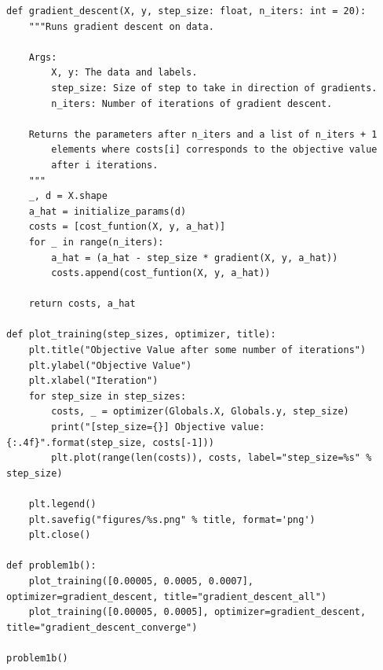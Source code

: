 \documentclass[12pt]{article}
\begin{document}
\begin{enumerate}[label=(\alph*)]
\begin{verbatim}
def gradient_descent(X, y, step_size: float, n_iters: int = 20):
    """Runs gradient descent on data.
    
    Args:
        X, y: The data and labels.
        step_size: Size of step to take in direction of gradients.
        n_iters: Number of iterations of gradient descent.
        
    Returns the parameters after n_iters and a list of n_iters + 1
        elements where costs[i] corresponds to the objective value
        after i iterations.
    """
    _, d = X.shape
    a_hat = initialize_params(d)
    costs = [cost_funtion(X, y, a_hat)]
    for _ in range(n_iters):
        a_hat = (a_hat - step_size * gradient(X, y, a_hat))
        costs.append(cost_funtion(X, y, a_hat))
        
    return costs, a_hat

def plot_training(step_sizes, optimizer, title):
    plt.title("Objective Value after some number of iterations")
    plt.ylabel("Objective Value")
    plt.xlabel("Iteration")
    for step_size in step_sizes:
        costs, _ = optimizer(Globals.X, Globals.y, step_size)
        print("[step_size={}] Objective value: {:.4f}".format(step_size, costs[-1]))
        plt.plot(range(len(costs)), costs, label="step_size=%s" % step_size)

    plt.legend()
    plt.savefig("figures/%s.png" % title, format='png')
    plt.close()

def problem1b():
    plot_training([0.00005, 0.0005, 0.0007], optimizer=gradient_descent, title="gradient_descent_all")
    plot_training([0.00005, 0.0005], optimizer=gradient_descent, title="gradient_descent_converge")

problem1b()
\end{verbatim}


\end{enumerate}
\end{document}
